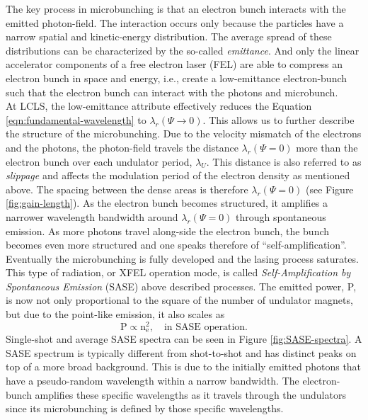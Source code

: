%
The key process in microbunching is that an electron bunch interacts with the emitted photon-field. The interaction occurs only because the particles have a narrow spatial and kinetic-energy distribution. The average spread of these distributions can be characterized by the so-called \textit{emittance}. And only the linear accelerator components of a free electron laser (FEL) are able to compress an electron bunch in space and energy, i.e., create a low-emittance electron-bunch such that the electron bunch can interact with the photons and microbunch.\\[1\baselineskip]
%
At LCLS, the low-emittance attribute effectively reduces the Equation \ref{eqn:fundamental-wavelength} to $\lambda_{r}(\Psi \rightarrow 0)$. This allows us to further describe the structure of the microbunching. Due to the velocity mismatch of the electrons and the photons, the photon-field travels the distance $\lambda_{r}(\Psi = 0)$ more than the electron bunch over each undulator period, $\lambda_{U}$. This distance is also referred to as \textit{slippage} and affects the modulation period of the electron density as mentioned above. The spacing between the dense areas is therefore $\lambda_{r}(\Psi = 0)$ (see Figure \ref{fig:gain-length}). As the electron bunch becomes structured, it amplifies a narrower wavelength bandwidth around $\lambda_{r}(\Psi = 0)$ through spontaneous emission. As more photons travel along-side the electron bunch, the bunch becomes even more structured and one speaks therefore of ``self-amplification''. Eventually the microbunching is fully developed and the lasing process saturates.\\[1\baselineskip]
%
This type of radiation, or XFEL operation mode, is called \textit{Self-Amplification by Spontaneous Emission} (SASE) above described processes. The emitted power, P, is now not only proportional to the square of the number of undulator magnets, but due to the point-like emission, it also scales as \citep{Als-Nielson-2011-JWS}
\begin{equation}
\text{P} \propto \text{n}_{\text{e}}^{2},\quad \text{in SASE operation.}
\end{equation}
Single-shot and average SASE spectra can be seen in Figure \ref{fig:SASE-spectra}. A SASE spectrum is typically different from shot-to-shot and has distinct peaks on top of a more broad background. This is due to the initially emitted photons that have a pseudo-random wavelength within a narrow bandwidth. The electron-bunch amplifies these specific wavelengths as it travels through the undulators since its microbunching is defined by those specific wavelengths.\\[1\baselineskip]
